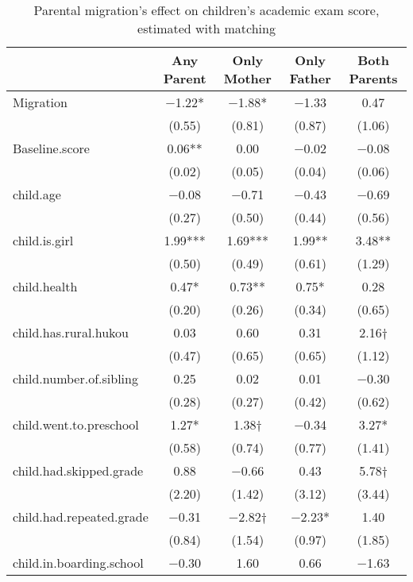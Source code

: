 \documentclass[
  man,floatsintext]{apa7}
\begin{document}
\begin{table}

\caption{Parental migration’s effect on children’s academic exam score, estimated with matching}
\centering
\begin{tabular}[t]{lcccc}
\toprule
  & Any Parent & Only Mother & Only Father & Both Parents\\
\midrule
Migration & \num{-1.22}* & \num{-1.88}* & \num{-1.33} & \num{0.47}\\
 & (\num{0.55}) & (\num{0.81}) & (\num{0.87}) & (\num{1.06})\\
Baseline.score & \num{0.06}** & \num{0.00} & \num{-0.02} & \num{-0.08}\\
 & (\num{0.02}) & (\num{0.05}) & (\num{0.04}) & (\num{0.06})\\
child.age & \num{-0.08} & \num{-0.71} & \num{-0.43} & \num{-0.69}\\
 & (\num{0.27}) & (\num{0.50}) & (\num{0.44}) & (\num{0.56})\\
child.is.girl & \num{1.99}*** & \num{1.69}*** & \num{1.99}** & \num{3.48}**\\
 & (\num{0.50}) & (\num{0.49}) & (\num{0.61}) & (\num{1.29})\\
child.health & \num{0.47}* & \num{0.73}** & \num{0.75}* & \num{0.28}\\
 & (\num{0.20}) & (\num{0.26}) & (\num{0.34}) & (\num{0.65})\\
child.has.rural.hukou & \num{0.03} & \num{0.60} & \num{0.31} & \num{2.16}†\\
 & (\num{0.47}) & (\num{0.65}) & (\num{0.65}) & (\num{1.12})\\
child.number.of.sibling & \num{0.25} & \num{0.02} & \num{0.01} & \num{-0.30}\\
 & (\num{0.28}) & (\num{0.27}) & (\num{0.42}) & (\num{0.62})\\
child.went.to.preschool & \num{1.27}* & \num{1.38}† & \num{-0.34} & \num{3.27}*\\
 & (\num{0.58}) & (\num{0.74}) & (\num{0.77}) & (\num{1.41})\\
child.had.skipped.grade & \num{0.88} & \num{-0.66} & \num{0.43} & \num{5.78}†\\
 & (\num{2.20}) & (\num{1.42}) & (\num{3.12}) & (\num{3.44})\\
child.had.repeated.grade & \num{-0.31} & \num{-2.82}† & \num{-2.23}* & \num{1.40}\\
 & (\num{0.84}) & (\num{1.54}) & (\num{0.97}) & (\num{1.85})\\
child.in.boarding.school & \num{-0.30} & \num{1.60} & \num{0.66} & \num{-1.63}\\

\end{tabular}
\end{table}
\end{document}

